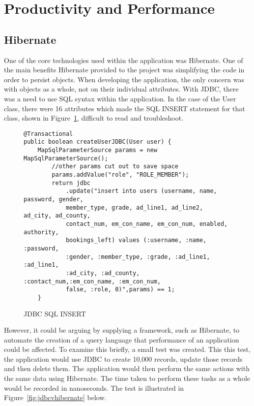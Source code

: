 \section{Productivity and Performance}

\subsection{Hibernate}

One of the core technologies used within the application was Hibernate. One of the main benefits Hibernate provided to the project was simplifying the code in order to persist objects. When developing the application, the only concern was with objects as a whole, not on their individual attributes. With JDBC, there was a need to use SQL syntax within the application. In the case of the User class, there were 16 attributes which made the SQL INSERT statement for that class, shown in Figure~\ref{fig:jdbcsql}, difficult to read and troubleshoot.

\begin{figure}[H]
\begin{lstlisting}
@Transactional
public boolean createUserJDBC(User user) {
	MapSqlParameterSource params = new MapSqlParameterSource();
		//other params cut out to save space
		params.addValue("role", "ROLE_MEMBER");
		return jdbc
			.update("insert into users (username, name, password, gender, 
			member_type, grade, ad_line1, ad_line2, ad_city, ad_county,
			contact_num, em_con_name, em_con_num, enabled, authority,
			bookings_left) values (:username, :name, :password, 
			:gender, :member_type, :grade, :ad_line1, :ad_line1, 
			:ad_city, :ad_county, :contact_num,:em_con_name, :em_con_num,
			false, :role, 0)",params) == 1;
	}
\end{lstlisting}
\caption{JDBC SQL INSERT}
\label{fig:jdbcsql}
\end{figure}

However, it could be arguing by supplying a framework, such as Hibernate, to automate the creation of a query language that performance of an application could be affected. To examine this briefly, a small test was created. This this test, the application would use JDBC to create 10,000 records, update those records and then delete them. The application would then perform the same actions with the same data using Hibernate. The time taken to perform these tasks as a whole would be recorded in nanoseconds. The test is illustrated in Figure~\ref{fig:jdbcvhibernate} below.

